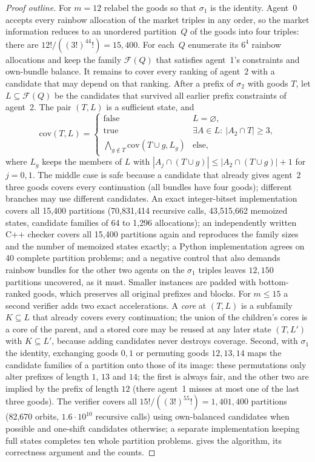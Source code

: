 \documentclass[sigconf,anonymous]{aamas}
\begin{document}
\begin{proof}[Proof outline]
For $m=12$ relabel the goods so that $\sigma_1$ is the identity. Agent~0 accepts every rainbow allocation of the market triples in any order, so the market information reduces to an unordered partition~$Q$ of the goods into four triples: there are $12!/((3!)^44!)=15{,}400$. For each~$Q$ enumerate its $6^4$ rainbow allocations and keep the family $\mathcal F(Q)$ that satisfies agent~1's constraints and own-bundle balance. It remains to cover every ranking of agent~2 with a candidate that may depend on that ranking. After a prefix of $\sigma_2$ with goods $T$, let $L\subseteq\mathcal F(Q)$ be the candidates that survived all earlier prefix constraints of agent~2. The pair $(T,L)$ is a sufficient state, and
\[
\mathrm{cov}(T,L)=\begin{cases}\text{false} & L=\varnothing,\\ \text{true} & \exists A\in L:\ |A_2\cap T|\ge3,\\ \bigwedge_{g\notin T}\mathrm{cov}(T\cup g,L_g) & \text{else,}\end{cases}
\]
where $L_g$ keeps the members of $L$ with $|A_j\cap(T\cup g)|\le|A_2\cap(T\cup g)|+1$ for $j=0,1$. The middle case is safe because a candidate that already gives agent~2 three goods covers every continuation (all bundles have four goods); different branches may use different candidates. An exact integer-bitset implementation covers all 15{,}400 partitions (70{,}831{,}414 recursive calls, 43{,}515{,}662 memoized states, candidate families of 64 to 1{,}296 allocations); an independently written C++ checker covers all 15{,}400 partitions again and reproduces the family sizes and the number of memoized states exactly; a Python implementation agrees on 40 complete partition problems; and a negative control that also demands rainbow bundles for the other two agents on the $\sigma_1$ triples leaves $12{,}150$ partitions uncovered, as it must. Smaller instances are padded with bottom-ranked goods, which preserves all original prefixes and blocks. For $m\le15$ a second verifier adds two exact accelerations. A \emph{core} at $(T,L)$ is a subfamily $K\subseteq L$ that already covers every continuation; the union of the children's cores is a core of the parent, and a stored core may be reused at any later state $(T,L')$ with $K\subseteq L'$, because adding candidates never destroys coverage. Second, with $\sigma_1$ the identity, exchanging goods $0,1$ or permuting goods $12,13,14$ maps the candidate families of a partition onto those of its image: these permutations only alter prefixes of length $1$, $13$ and $14$; the first is always fair, and the other two are implied by the prefix of length $12$ (there agent~1 misses at most one of the last three goods). The verifier covers all $15!/((3!)^55!)=1{,}401{,}400$ partitions (82{,}670 orbits, $1.6\cdot10^{10}$ recursive calls) using own-balanced candidates when possible and one-shift candidates otherwise; a separate implementation keeping full states completes ten whole partition problems. \appCoverage gives the algorithm, its correctness argument and the counts.
\end{proof}
\end{document}
